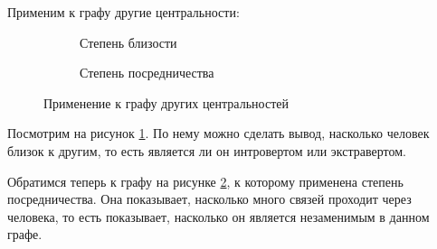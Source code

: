 Применим к графу другие центральности:
\begin{figure}[H]
    \centering
    \begin{subfigure}[b]{0.45\textwidth}
        \centering
        
        \caption{Степень близости}
        \label{fig:graph_clossenes}
    \end{subfigure}
    \begin{subfigure}[b]{0.45\textwidth}
        \centering
        
        \caption{Степень посредничества}
        \label{fig:graph_betweenes}
    \end{subfigure}
    \caption{Применение к графу других центральностей}
    \label{fig:graph_centrality}
\end{figure}
Посмотрим на рисунок \ref{fig:graph_clossenes}. По нему можно сделать вывод, насколько человек близок к другим, то есть является ли он интровертом или экстравертом.

Обратимся теперь к графу на рисунке \ref{fig:graph_betweenes}, к которому применена степень посредничества. Она показывает, насколько много связей проходит через человека, то есть показывает, насколько он является незаменимым в данном графе.